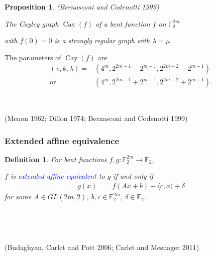 \documentclass[pdf,sprung,slideColor,nocolorBG]{beamer}
\newenvironment{colortheme}[1]{
\def\ProvidesPackageRCS $##1${\relax}
\renewcommand{\ProcessOptions}{\relax}
\makeatletter

\makeatother
}{}
\newcommand{\slidecite}[1]{\tiny{(#1)}\normalsize{}}
\newcommand{\smallcite}[1]{\small{(#1)}\normalsize{}}
\newcommand{\mb}[1]{\mathbb{#1}}
\newcommand{\Emph}[1]{\emph{\textcolor{blue}{#1}}}
\newcommand{\To}{\rightarrow}
\newcommand{\Cay}[1]{\operatorname{Cay}\left(#1\right)}
\newcommand{\F}{\mb{F}}
\newtheorem{Def}{Definition}
\newtheorem{Proposition}{Proposition}
\begin{document}
\begin{colortheme}{seagull}
\begin{frame}
\begin{Proposition}
\smallcite{Bernasconi and Codenotti 1999}

The Cayley graph $\Cay{f}$ of a bent function $f$ on $\F_2^{2m}$

with $f(0)=0$ is a strongly regular graph with $\lambda = \mu.$
\end{Proposition}

The parameters of $\Cay{f}$ are
\begin{align*}
(v,k,\lambda) = &(4^m, 2^{2 m - 1} - 2^{m-1}, 2^{2 m - 2} - 2^{m-1})
\\
  \text{or} \quad &(4^m, 2^{2 m - 1} + 2^{m-1}, 2^{2 m - 2} + 2^{m-1}).
\end{align*}

~

\slidecite{Menon 1962; Dillon 1974; Bernasconi and Codenotti 1999}
\end{frame}
\end{colortheme}

\begin{colortheme}{seagull}

\begin{frame}
\frametitle{Extended affine equivalence}

\begin{Def}
For bent functions $f,g : \F_2^{2m} \To \F_2$,

$f$ is \Emph{extended affine equivalent} to $g$ if and only if
\begin{align*}
g(x) &= f(A x + b) + \langle c, x \rangle + \delta
\end{align*}
for some $A \in GL(2m,2)$, $b, c \in \F_2^{2m}$, $\delta \in \F_2$.
\end{Def}

~

~

\slidecite{Budaghyan, Carlet and Pott 2006; Carlet and Mesnager 2011}
\end{frame}

\end{colortheme}
\end{document}
